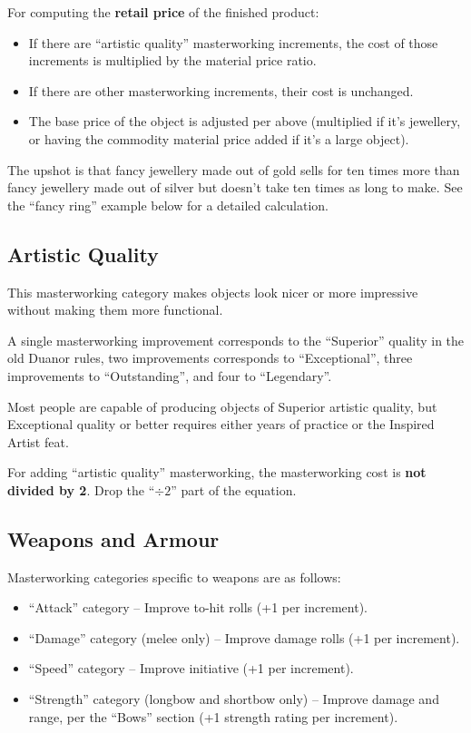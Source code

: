 For computing the \textbf{retail price} of the finished product:
\begin{itemize}
\item If there are ``artistic quality'' masterworking increments, the cost
of those increments is multiplied by the material price ratio.
\item If there are other masterworking increments, their cost is unchanged.
\item The base price of the object is adjusted per above (multiplied if it's
jewellery, or having the commodity material price added if it's a large
object).
\end{itemize}

The upshot is that fancy jewellery made out of gold sells for ten times
more than fancy jewellery made out of silver but doesn't take ten times as
long to make. See the ``fancy ring'' example below for a detailed
calculation.
%

%
\subsection{Artistic Quality}

This masterworking category makes objects look nicer or more impressive
without making them more functional.

A single masterworking improvement corresponds to the ``Superior'' quality
in the old Duanor rules, two improvements corresponds to ``Exceptional'',
three improvements to ``Outstanding'', and four to ``Legendary''.

Most people are capable of producing objects of Superior artistic quality,
but Exceptional quality or better requires either years of practice or the
Inspired Artist feat.

For adding ``artistic quality'' masterworking, the masterworking cost is
\textbf{not divided by 2}. Drop the ``$\div 2$'' part of the equation.
%

%
\subsection{Weapons and Armour}

Masterworking categories specific to weapons are as follows:
\begin{itemize}
\item ``Attack'' category -- Improve to-hit rolls (+1 per increment).
\item ``Damage'' category (melee only) --
Improve damage rolls (+1 per increment).
\item ``Speed'' category -- Improve initiative (+1 per increment).
\item ``Strength'' category (longbow and shortbow only) --
Improve damage and range, per the ``Bows'' section (+1 strength rating
per increment).
\end{itemize}

